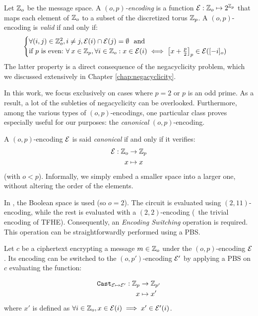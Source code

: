 \begin{definition}[$(o, p)$-encoding]
    Let $\mathbb{Z}_o$ be the message space. A \emph{$(o, p)$-encoding} is a function $\mathcal{E}: \mathbb{Z}_o \mapsto 2^{\mathbb{Z}_p}$ that maps each element of $\mathbb{Z}_o$ to a subset of the discretized torus $\mathbb{Z}_p$. A $(o, p)$-encoding is \emph{valid} if and only if:
    \begin{equation}
        \begin{cases}
            \forall (i, j) \in \mathbb{Z}_o^2, i \ne j, \mathcal{E}(i) \cap \mathcal{E}(j) = \emptyset~\text{ and}\\
            \text{if $p$ is even:} ~\forall \:x \in \mathbb Z_p, \forall i \in \mathbb{Z}_o: x \in \mathcal{E}(i) \iff \left [ x + \frac p 2 \right ]_p \in \mathcal{E}([-i]_o)
        \end{cases}
    \label{def:validity}
    \end{equation}
    The latter property is a direct consequence of the negacyclicity problem, which we discussed extensively in Chapter \ref{chap:negacyclicity}.
    \label{def:encoding}
\end{definition}

In this work, we focus exclusively on cases where $p=2$ or $p$ is an odd prime. As a result, a lot of the subleties of negacyclicity can be overlooked. Furthermore, among the various types of $(o, p)$-encodings, one particular class proves especially useful for our purposes: the \textit{canonical} $(o, p)$-encoding.

\begin{definition}
\label{def:canonical-encoding}
    A $(o, p)$-encoding $\mathcal{E}$ is said \textit{canonical} if and only if it verifies: 
    \begin{align*}
    \mathcal{E}: \mathbb{Z}_o &\rightarrow \mathbb{Z}_p\\
    x &\mapsto x
    \end{align*}
    (with $o < p$). Informally, we simply embed a smaller space into a larger one, without altering the order of the elements.
\end{definition}


In \cite{TCHES:BonPoiRiv24}, the Boolean space is used (so $o=2$). The \SubBytes circuit is evaluated using $(2,11)$-encoding, while the rest is evaluated with a $(2, 2)$-encoding (\ie~the trivial encoding of TFHE). Consequently, an \textit{Encoding Switching} operation is required. This operation can be straightforwardly performed using a PBS.

\begin{definition}
 \label{def:encoding-switching}
    Let $c$ be a ciphertext encrypting a message $m \in \mathbb{Z}_o$ under the $(o, p)$-encoding $\mathcal{E}$. Its encoding can be switched to the $(o, p')$-encoding $\mathcal{E}'$ by applying a PBS on $c$ evaluating the function:
    
    \begin{align*}
        \texttt{Cast}_{\mathcal{E} \mapsto \mathcal{E}'}: \mathbb{Z}_p &\rightarrow \mathbb{Z}_{p'}\\
        x &\mapsto x'
    \end{align*}
    where $x'$ is defined as $\forall i \in \mathbb{Z}_o, x \in \mathcal{E}(i) \implies x' \in \mathcal{E}'(i)$.
\end{definition}

